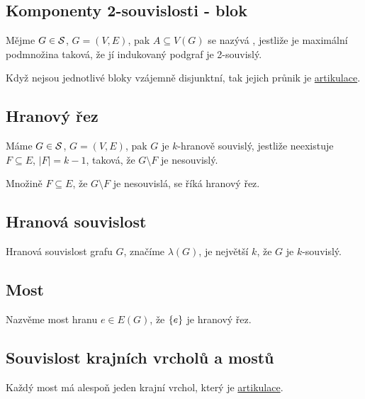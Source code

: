 \subsection{Komponenty 2-souvislosti - blok}
Mějme $G \in \S$, $G = (V,E)$, pak $A \subseteq V(G)$ se nazývá , jestliže je maximální podmnožina taková, že 
jí indukovaný podgraf je 2-souvislý. \\
\begin{figure}[H]
    \centering
\end{figure}
Když nejsou jednotlivé bloky vzájemně disjunktní, tak jejich průnik je \hyperref[artikulace]{artikulace}.

\subsection{Hranový řez}
Máme $G \in \S$, $G = (V,E)$, pak $G$ je $k$-hranově souvislý, jestliže neexistuje $F \subseteq E$, $|F| = k-1$, taková,
že $G \setminus F$ je nesouvislý.

Množině $F \subseteq E$, že $G \setminus F$ je nesouvislá, se říká hranový řez.

\subsection{Hranová souvislost}
Hranová souvislost grafu $G$, značíme $\lambda(G)$, je největší $k$, že $G$ je $k$-souvislý.\\


\subsection{Most}
Nazvěme most hranu $e\in E(G)$, že $\bc{e}$ je hranový řez.

\subsection{Souvislost krajních vrcholů a mostů} %
Každý most má alespoň jeden krajní vrchol, který je \hyperref[artikulace]{artikulace}.

